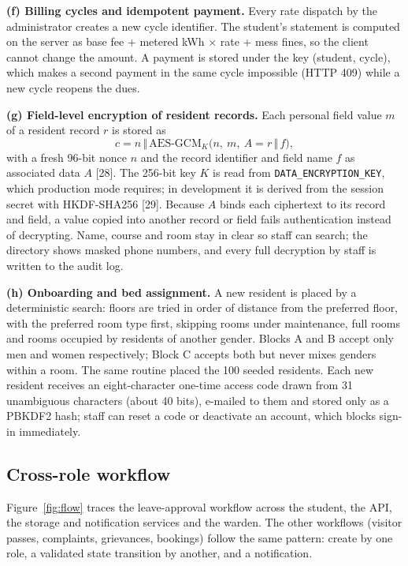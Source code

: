 \documentclass[12pt,a4paper,oneside]{report}
\begin{document}
\textbf{(f) Billing cycles and idempotent payment.} Every rate dispatch by the administrator creates a new cycle
identifier. The student's statement is computed on the server as base fee + metered kWh $\times$ rate + mess fines, so
the client cannot change the amount. A payment is stored under the key (student, cycle), which makes a second payment
in the same cycle impossible (HTTP 409) while a new cycle reopens the dues.

\textbf{(g) Field-level encryption of resident records.} Each personal field value $m$ of a resident record $r$ is
stored as
\begin{equation}
c = n \,\Vert\, \mathrm{AES\text{-}GCM}_K\big(n,\ m,\ A = r \,\Vert\, f\big),
\end{equation}
with a fresh 96-bit nonce $n$ and the record identifier and field name $f$ as associated data $A$ [28]. The 256-bit
key $K$ is read from \texttt{DATA\_ENCRYPTION\_KEY}, which production mode requires; in development it is derived
from the session secret with HKDF-SHA256 [29]. Because $A$ binds each ciphertext to its record and field, a value
copied into another record or field fails authentication instead of decrypting. Name, course and room stay in clear
so staff can search; the directory shows masked phone numbers, and every full decryption by staff is written to the
audit log.

\textbf{(h) Onboarding and bed assignment.} A new resident is placed by a deterministic search: floors are tried in
order of distance from the preferred floor, with the preferred room type first, skipping rooms under maintenance,
full rooms and rooms occupied by residents of another gender. Blocks A and B accept only men and women respectively;
Block C accepts both but never mixes genders within a room. The same routine placed the 100 seeded residents. Each
new resident receives an eight-character one-time access code drawn from 31 unambiguous characters (about 40 bits),
e-mailed to them and stored only as a PBKDF2 hash; staff can reset a code or deactivate an account, which blocks
sign-in immediately.

\subsection{Cross-role workflow}
Figure~\ref{fig:flow} traces the leave-approval workflow across the student, the API, the storage and notification
services and the warden. The other workflows (visitor passes, complaints, grievances, bookings) follow the same pattern:
create by one role, a validated state transition by another, and a notification.
\end{document}
